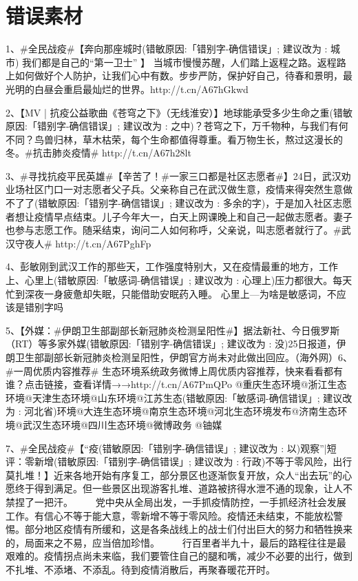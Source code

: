 \chapter{错误素材}


1、\#全民战疫\#【奔向那座城时{\color{red}(错敏原因:「错别字-确信错误」; 建议改为 : 城市)} 我们都是自己的“第一卫士” 】 当城市慢慢苏醒，人们踏上返程之路。返程路上如何做好个人防护，让我们心中有数。步步严防，保护好自己，待春和景明，最光明的白昼会重启最灿烂的世界。http://t.cn/A67hGkwd ​

2、【MV | 抗疫公益歌曲《苍穹之下》（无线淮安）】地球能承受多少生命{\color{red}之重(错敏原因:「错别字-确信错误」; 建议改为 : 之中)}？苍穹之下，万千物种，与我们有何不同？鸟兽归林，草木枯荣，每个生命都值得尊重。看万物生长，熬过这漫长的冬。\#抗击肺炎疫情\# http://t.cn/A67h28lt ​

3、\#寻找抗疫平民英雄\#【辛苦了！\#一家三口都是社区志愿者\#】24日，武汉劝业场社区门口一对志愿者父子兵。父亲称自己在武汉做生意，疫情来得突然生意{\color{red}做不了了(错敏原因:「错别字-确信错误」; 建议改为 : 多余的字)}，于是加入社区志愿者想让疫情早点结束。儿子今年大一，白天上网课晚上和自己一起做志愿者。妻子也参与志愿工作。随采结束，询问二人如何称呼，父亲说，叫志愿者就行了。\#武汉守夜人\# http://t.cn/A67PghFp

4、彭敏刚到武汉工作的那些天，工作强度特别大，又在疫情最重的地方，工作上、{\color{red}心里上(错敏原因:「敏感词-确信错误」; 建议改为 : 心理上)}压力都很大。每天忙到深夜一身疲惫却失眠，只能借助安眠药入睡。
心里上—为啥是敏感词，不应该是错别字吗

5、【外媒：\#伊朗卫生部副部长新冠肺炎检测呈阳性\#】据法新社、今日俄罗斯（RT）等{\color{red}多家外媒(错敏原因:「错别字-确信错误」; 建议改为 : 没)}25日报道，伊朗卫生部副部长新冠肺炎检测呈阳性，伊朗官方尚未对此做出回应。（海外网）
 ​
6、\#一周优质内容推荐\# 生态环境系统政务微博上周优质内容推荐，快来看看都有谁？点击链接，查看详情→→http://t.cn/A67PmQPo @重庆生态环境@浙江生态环境@天津生态环境@山东环境@江苏生态{\color{red}(错敏原因:「敏感词-确信错误」; 建议改为 : 河北省)}环境@大连生态环境@南京生态环境@河北生态环境发布@济南生态环境@武汉生态环境@四川生态环境@微博政务 @铀媒 ​

7、\#全民战疫\#{\color{red}【“疫(错敏原因:「错别字-确信错误」; 建议改为 : 以)}观察”|短评：{\color{red}零新增(错敏原因:「错别字-确信错误」; 建议改为 : 行政)}不等于零风险，出行莫扎堆！】近来各地开始有序复工，部分景区也逐渐恢复开放，众人“出去玩”的心愿终于得到满足。但一些景区出现游客扎堆、道路被挤得水泄不通的现象，让人不禁捏了一把汗。 　　党中央从全局出发，一手抓疫情防控，一手抓经济社会发展工作。有信心不等于能大意，零新增不等于零风险。疫情还未结束，不能放松警惕。部分地区疫情有所缓和，这是各条战线上的战士们付出巨大的努力和牺牲换来的，局面来之不易，应当倍加珍惜。 　　行百里者半九十，最后的路程往往是最艰难的。疫情拐点尚未来临，我们要管住自己的腿和嘴，减少不必要的出行，做到不扎堆、不添堵、不添乱。待到疫情消散后，再聚春暖花开时。

